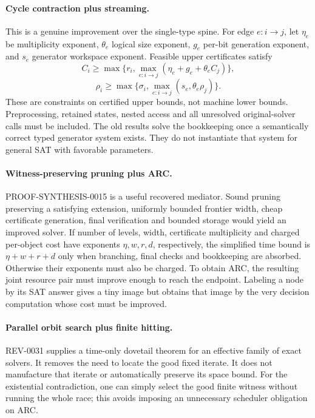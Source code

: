 \documentclass[11pt]{article}
\begin{document}
\paragraph{Cycle contraction plus streaming.}
This is a genuine improvement over the single-type spine. For edge $e:i\to j$, let $\eta_e$ be multiplicity exponent, $\theta_e$ logical size exponent, $g_e$ per-bit generation exponent, and $s_e$ generator workspace exponent. Feasible upper certificates satisfy
\[
C_i\ge\max\{r_i,\max_{e:i\to j}(\eta_e+g_e+\theta_e C_j)\},
\]
\[
\rho_i\ge\max\{\sigma_i,\max_{e:i\to j}(s_e,\theta_e\rho_j)\}.
\]
These are constraints on certified upper bounds, not machine lower bounds. Preprocessing, retained states, nested access and all unresolved original-solver calls must be included. The old results solve the bookkeeping once a semantically correct typed generator system exists. They do not instantiate that system for general SAT with favorable parameters.

\paragraph{Witness-preserving pruning plus ARC.}
PROOF-SYNTHESIS-0015 is a useful recovered mediator. Sound pruning preserving a satisfying extension, uniformly bounded frontier width, cheap certificate generation, final verification and bounded storage would yield an improved solver. If number of levels, width, certificate multiplicity and charged per-object cost have exponents $\eta,w,r,d$, respectively, the simplified time bound is $\eta+w+r+d$ only when branching, final checks and bookkeeping are absorbed. Otherwise their exponents must also be charged. To obtain ARC, the resulting joint resource pair must improve enough to reach the endpoint. Labeling a node by its SAT answer gives a tiny image but obtains that image by the very decision computation whose cost must be improved.

\paragraph{Parallel orbit search plus finite hitting.}
REV-0031 supplies a time-only dovetail theorem for an effective family of exact solvers. It removes the need to locate the good fixed iterate. It does not manufacture that iterate or automatically preserve its space bound. For the existential contradiction, one can simply select the good finite witness without running the whole race; this avoids imposing an unnecessary scheduler obligation on ARC.
\end{document}
